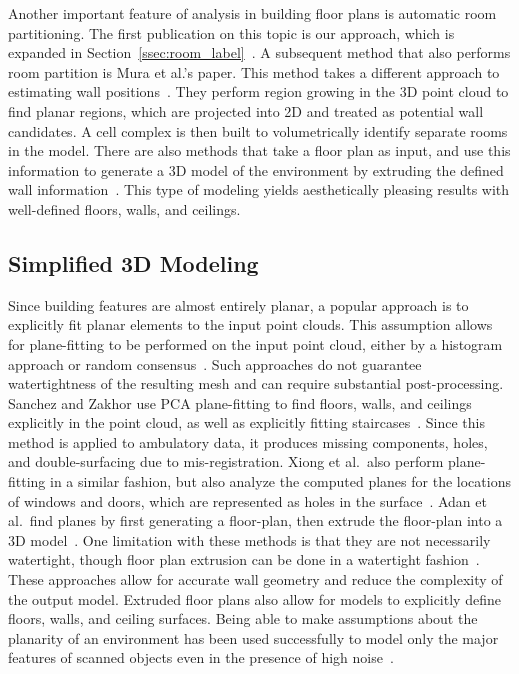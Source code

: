 \documentclass[12pt,onecolumn,oneside]{book}
\begin{document}
Another important feature of analysis in building floor plans is automatic room partitioning.  The first publication on this topic is our approach, which is expanded in Section~\ref{ssec:room_label}~\cite{Turner14}.  A subsequent method that also performs room partition is Mura et al.'s paper.  This method takes a different approach to estimating wall positions~\cite{Mura13}.  They perform region growing in the 3D point cloud to find planar regions, which are projected into 2D and treated as potential wall candidates.  A cell complex is then built to volumetrically identify separate rooms in the model.  There are also methods that take a floor plan as input, and use this information to generate a 3D model of the environment by extruding the defined wall information~\cite{Or05,Lewis98}.  This type of modeling yields aesthetically pleasing results with well-defined floors, walls, and ceilings.

\subsection{Simplified 3D Modeling}
\label{ssec:background_planefit}

Since building features are almost entirely planar, a popular approach is to explicitly fit planar elements to the input point clouds.  This assumption allows for plane-fitting to be performed on the input point cloud, either by a histogram approach or random consensus~\cite{WallFinder,BasicPlaneFit}.  Such approaches do not guarantee watertightness of the resulting mesh and can require substantial post-processing.  Sanchez and Zakhor use PCA plane-fitting to find floors, walls, and ceilings explicitly in the point cloud, as well as explicitly fitting staircases~\cite{Victors}. Since this method is applied to ambulatory data, it produces missing components, holes, and double-surfacing due to mis-registration.  Xiong et al.\ also perform plane-fitting in a similar fashion, but also analyze the computed planes for the locations of windows and doors, which are represented as holes in the surface~\cite{Xiong13}.  Adan et al.\ find planes by first generating a floor-plan, then extrude the floor-plan into a 3D model~\cite{WallFinder}.  One limitation with these methods is that they are not necessarily watertight, though floor plan extrusion can be done in a watertight fashion~\cite{Mura14,Turner14,Cabral14}.  These approaches allow for accurate wall geometry and reduce the complexity of the output model. Extruded floor plans also allow for models to explicitly define floors, walls, and ceiling surfaces.  Being able to make assumptions about the planarity of an environment has been used successfully to model only the major features of scanned objects even in the presence of high noise~\cite{Lafarge13}.
\end{document}

